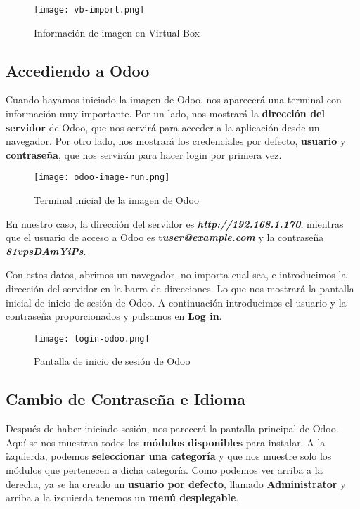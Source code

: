 \begin{figure}[ht]
    \centering
    \texttt{[image: vb-import.png]}
    \caption{Información de imagen en Virtual Box}
\end{figure}


\subsection{Accediendo a Odoo}
Cuando hayamos iniciado la imagen de Odoo, nos aparecerá una terminal con información muy importante. Por un lado, nos mostrará la \textbf{dirección del servidor} de Odoo, que nos servirá para acceder a la aplicación desde un navegador. Por otro lado, nos mostrará los credenciales por defecto, \textbf{usuario} y \textbf{contraseña}, que nos servirán para hacer login por primera vez.

\begin{figure}[ht]
    \centering
    \texttt{[image: odoo-image-run.png]}
    \caption{Terminal inicial de la imagen de Odoo}
\end{figure}

En nuestro caso, la dirección del servidor es \textbf{\textit{http://192.168.1.170}}, mientras que el usuario de acceso a Odoo es t\textbf{\textit{user@example.com}} y la contraseña \textbf{\textit{81vpsDAmYiPs}}.

Con estos datos, abrimos un navegador, no importa cual sea, e introducimos la dirección del servidor en la barra de direcciones. Lo que nos mostrará la pantalla inicial de inicio de sesión de Odoo. A continuación introducimos el usuario y la contraseña proporcionados y pulsamos en \textbf{Log in}.


\begin{figure}[ht]
    \centering
    \texttt{[image: login-odoo.png]}
    \caption{Pantalla de inicio de sesión de Odoo}
\end{figure}

\subsection{Cambio de Contraseña e Idioma}
Después de haber iniciado sesión, nos parecerá la pantalla principal de Odoo. Aquí se nos muestran todos los\textbf{ módulos disponibles} para instalar. A la izquierda, podemos \textbf{seleccionar una categoría} y que nos muestre solo los módulos que pertenecen a dicha categoría. Como podemos ver arriba a la derecha, ya se ha creado un \textbf{usuario por defecto}, llamado \textbf{Administrator} y arriba a la izquierda tenemos un \textbf{menú desplegable}.

